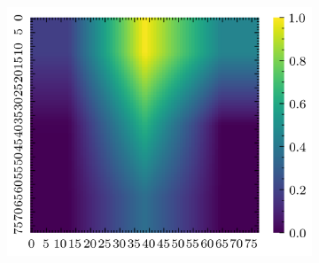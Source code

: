 \begin{figure}[H]
\begin{subfigure}[b]{0.19\textwidth}
        \includegraphics[width=\linewidth]{../img/5/quarry/worst/grad-cam-2d-4.png}
    \end{subfigure}  


\end{figure}
